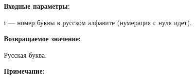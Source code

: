 \textbf{Входные параметры:}

i --- номер буквы в русском алфавите (нумерация с нуля идет).

\textbf{Возвращаемое значение:}

Русская буква.

\textbf{Примечание:}